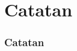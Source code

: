 \documentclass[table,dvipsnames]{beamer}
\begin{document}
% 
% 

\section{Catatan}

\begin{frame}
\frametitle{Catatan}
\end{frame}
\end{document}
